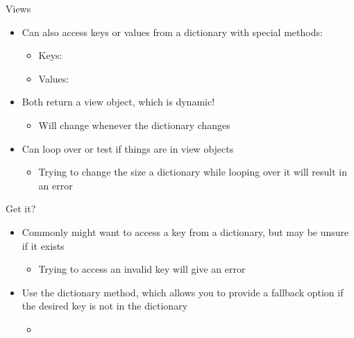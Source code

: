 \documentclass[pdf, aspectratio=169, 12pt]{beamer}
\begin{document}
\begin{frame}{Views}
	\begin{itemize}
		\item Can also access keys or values from a dictionary with special methods:
			\begin{itemize}
				\item Keys: 
				\item Values: 
			\end{itemize}
		\item Both return a \alert{view object}, which is dynamic!
			\begin{itemize}
				\item Will change whenever the dictionary changes
			\end{itemize}
		\item Can loop over or test if things are in view objects
			\begin{itemize}
				\item Trying to change the size a dictionary while looping over it will result in an error
			\end{itemize}
	\end{itemize}
\end{frame}

\begin{frame}{Get it?}
	\begin{itemize}
		\item Commonly might want to access a key from a dictionary, but may be unsure if it exists
			\begin{itemize}
				\item Trying to access an invalid key will give an error
			\end{itemize}
		\item Use the  dictionary method, which allows you to provide a fallback option if the desired key is not in the dictionary
			\begin{itemize}
				\item {}
			\end{itemize}
	\end{itemize}
\end{frame}

		
\end{document}
